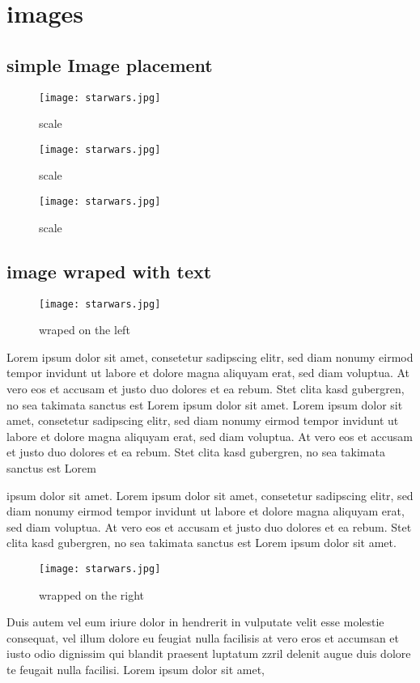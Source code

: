 \chapter{images}
\section{simple Image placement}
\begin{figure}[h]
	\centering
	\texttt{[image: starwars.jpg]}
	\caption{scale}
\end{figure}

\begin{figure}[h]
	\centering
	\texttt{[image: starwars.jpg]}
	\caption{scale}
\end{figure}
\begin{figure}[h]
	\centering
	\texttt{[image: starwars.jpg]}
	\caption{scale}
\end{figure}

\section{image wraped with text}
\begin{wrapfigure}{r}{0.3\textwidth} %
	\centering
	\texttt{[image: starwars.jpg]}
	\caption{wraped on the left}
\end{wrapfigure}

Lorem ipsum dolor sit amet, consetetur sadipscing elitr, sed diam nonumy eirmod tempor invidunt ut labore et dolore magna aliquyam erat, sed diam voluptua. At vero eos et accusam et justo duo dolores et ea rebum. Stet clita kasd gubergren, no sea takimata sanctus est Lorem ipsum dolor sit amet. Lorem ipsum dolor sit amet, consetetur sadipscing elitr, sed diam nonumy eirmod tempor invidunt ut labore et dolore magna aliquyam erat, sed diam voluptua. At vero eos et accusam et justo duo dolores et ea rebum. Stet clita kasd gubergren, no sea takimata sanctus est Lorem \par ipsum dolor sit amet. Lorem ipsum dolor sit amet, consetetur sadipscing elitr, sed diam nonumy eirmod tempor invidunt ut labore et dolore magna aliquyam erat, sed diam voluptua. At vero eos et accusam et justo duo dolores et ea rebum. Stet clita kasd gubergren, no sea takimata sanctus est Lorem ipsum dolor sit amet. 

\begin{wrapfigure}{l}{0.5\textwidth} %
	\centering
	\texttt{[image: starwars.jpg]}
	\caption{wrapped on the right}
\end{wrapfigure}

Duis autem vel eum iriure dolor in hendrerit in vulputate velit esse molestie consequat, vel illum dolore eu feugiat nulla facilisis at vero eros et accumsan et iusto odio dignissim qui blandit praesent luptatum zzril delenit augue duis dolore te feugait nulla facilisi. Lorem ipsum dolor sit amet,
